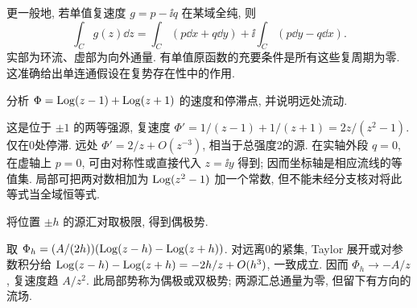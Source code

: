 更一般地, 若单值复速度 $g=p-\ii q$ 在某域全纯, 则
\[
\int_C g(z)\dd z=\int_C(p\dd x+q\dd y)+\ii\int_C(p\dd y-q\dd x).
\]
实部为环流、虚部为向外通量. 有单值原函数的充要条件是所有这些复周期为零. 这准确给出单连通假设在复势存在性中的作用.

\begin{example}
分析 $\Phi=\operatorname{Log}(z-1)+\operatorname{Log}(z+1)$ 的速度和停滞点, 并说明远处流动.
\end{example}
\begin{solution}
这是位于 $\pm1$ 的两等强源, 复速度 $\Phi'=1/(z-1)+1/(z+1)=2z/(z^2-1)$. 仅在0处停滞. 远处 $\Phi'=2/z+O(z^{-3})$, 相当于总强度2的源. 在实轴外段 $q=0$, 在虚轴上 $p=0$, 可由对称性或直接代入 $z=\ii y$ 得到; 因而坐标轴是相应流线的等值集. 局部可把两对数相加为 $\operatorname{Log}(z^2-1)$ 加一个常数, 但不能未经分支核对将此等式当全域恒等式.
\end{solution}
\begin{example}
将位置 $\pm h$ 的源汇对取极限, 得到偶极势.
\end{example}
\begin{solution}
取 $\Phi_h=(A/(2h))(\operatorname{Log}(z-h)-\operatorname{Log}(z+h))$. 对远离0的紧集, Taylor 展开或对参数积分给 $\operatorname{Log}(z-h)-\operatorname{Log}(z+h)=-2h/z+O(h^3)$, 一致成立. 因而 $\Phi_h\to-A/z$, 复速度趋 $A/z^2$. 此局部势称为偶极或双极势; 两源汇总通量为零, 但留下有方向的流场.
\end{solution}

